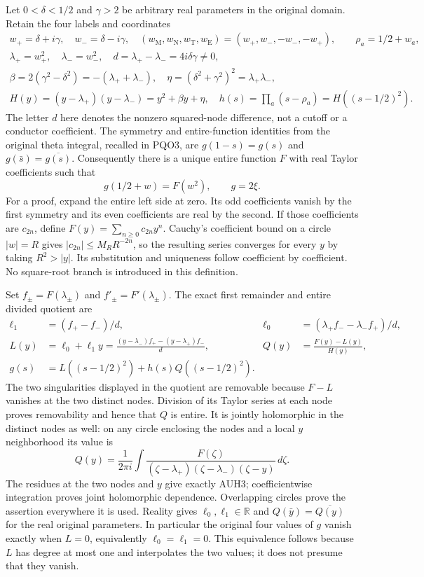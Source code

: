 \documentclass[11pt]{article}
\begin{document}
Let $0<\delta<1/2$ and $\gamma>2$ be arbitrary real parameters in
the original domain.  Retain the four labels and coordinates
\[
\begin{gathered}
 w_+=\delta+i\gamma,\quad w_-=\delta-i\gamma,\quad
 (w_{\mathrm M},w_{\mathrm N},w_{\mathrm T},w_{\mathrm E})
                  =(w_+,w_-,-w_-,-w_+),\qquad \rho_a=1/2+w_a,\\
 \lambda_+=w_+^2,\quad\lambda_-=w_-^2,\quad
 d=\lambda_+-\lambda_-=4i\delta\gamma\ne0,\\
 \beta=2(\gamma^2-\delta^2)=-(\lambda_++\lambda_-),\quad
 \eta=(\delta^2+\gamma^2)^2=\lambda_+\lambda_-,\\
 H(y)=(y-\lambda_+)(y-\lambda_-)=y^2+\beta y+\eta,\quad
 h(s)=\prod_a(s-\rho_a)=H((s-1/2)^2).
\end{gathered}\tag{AUH1}
\]
The letter $d$ here denotes the nonzero squared-node difference, not
a cutoff or a conductor coefficient.  The symmetry and entire-function
identities from the original theta integral, recalled in PQO3, are
$g(1-s)=g(s)$ and $g(\bar s)=\overline{g(s)}$.
Consequently there is a unique entire function $F$ with real Taylor
coefficients such that
\[
 g(1/2+w)=F(w^2),\qquad g=2\xi.
 \tag{AUH2}
\]
For a proof, expand the entire left side at zero.  Its odd coefficients
vanish by the first symmetry and its even coefficients are real by the
second.  If those coefficients are $c_{2n}$, define
$F(y)=\sum_{n\ge0}c_{2n}y^n$.  Cauchy's coefficient bound on a
circle $|w|=R$ gives $|c_{2n}|\le M_RR^{-2n}$, so the resulting
series converges for every $y$ by taking $R^2>|y|$.
Its substitution and uniqueness follow coefficient by coefficient.
No square-root branch is introduced in this definition.

Set $f_\pm=F(\lambda_\pm)$ and $f'_\pm=F'(\lambda_\pm)$.
The exact first remainder and entire divided quotient are
\[
\begin{aligned}
 \ell_1&=(f_+-f_-)/d,&
 \ell_0&=(\lambda_+f_--\lambda_-f_+)/d,\\
 L(y)&=\ell_0+\ell_1y
 =\frac{(y-\lambda_-)f_+-(y-\lambda_+)f_-}{d},&
 Q(y)&=\frac{F(y)-L(y)}{H(y)},\\
 g(s)&=L((s-1/2)^2)+h(s)Q((s-1/2)^2).
\end{aligned}\tag{AUH3}
\]
The two singularities displayed in the quotient are removable because
$F-L$ vanishes at the two distinct nodes.  Division of its Taylor
series at each node proves removability and hence that $Q$ is entire.
It is jointly holomorphic in the distinct nodes as well: on any circle
enclosing the nodes and a local $y$ neighborhood its value is
\[
 Q(y)=\frac1{2\pi i}\int
 \frac{F(\zeta)}{(\zeta-\lambda_+)(\zeta-\lambda_-)(\zeta-y)}
 \,d\zeta.
 \tag{AUH4}
\]
The residues at the two nodes and $y$ give exactly AUH3;
coefficientwise integration proves joint holomorphic dependence.
Overlapping circles prove the assertion everywhere it is used.
Reality gives $\ell_0,\ell_1\in\mathbb R$ and
$Q(\bar y)=\overline{Q(y)}$ for the real original parameters.
In particular the original four values of $g$ vanish exactly when
$L=0$, equivalently $\ell_0=\ell_1=0$.
This equivalence follows because $L$ has degree at most one and
interpolates the two values; it does not presume that they vanish.
\end{document}

